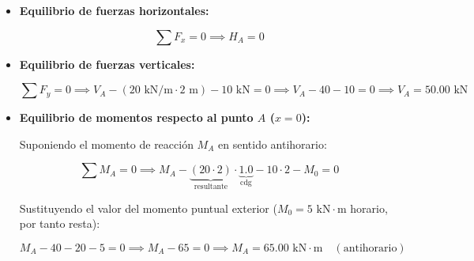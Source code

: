 \begin{itemize}

    \item \textbf{Equilibrio de fuerzas horizontales:}

          \begin{equation}

              \sum F_x = 0 \implies \boxed{H_A = 0}

          \end{equation}



    \item \textbf{Equilibrio de fuerzas verticales:}

          \begin{equation}

              \sum F_y = 0 \implies V_A - (20\text{ kN/m} \cdot 2\text{ m}) - 10\text{ kN} = 0 \implies V_A - 40 - 10 = 0 \implies \boxed{V_A = 50.00\text{ kN}}

          \end{equation}



    \item \textbf{Equilibrio de momentos respecto al punto $A$ ($x = 0$):}

          Suponiendo el momento de reacción $M_A$ en sentido antihorario:

          \begin{equation}

              \sum M_A = 0 \implies M_A - \underbrace{(20 \cdot 2)}_{\text{resultante}} \cdot \underbrace{1.0}_{\text{cdg}} - 10 \cdot 2 - M_0 = 0

          \end{equation}

          Sustituyendo el valor del momento puntual exterior ($M_0 = 5\text{ kN}\cdot\text{m}$ horario, por tanto resta):

          \begin{equation}

              M_A - 40 - 20 - 5 = 0 \implies M_A - 65 = 0 \implies \boxed{M_A = 65.00\text{ kN}\cdot\text{m}} \quad (\text{antihorario})

          \end{equation}

\end{itemize}






